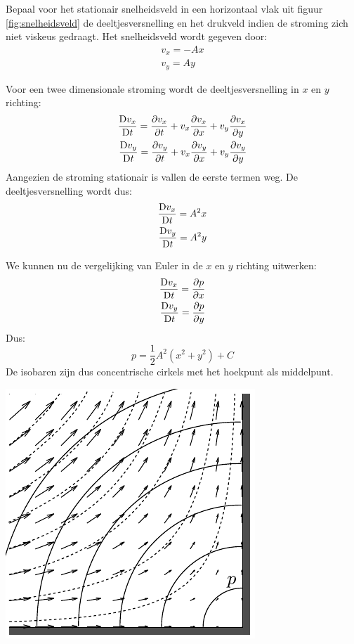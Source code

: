\begin{voorbeeld}
	Bepaal voor het stationair snelheidsveld in een horizontaal vlak uit figuur \ref{fig:snelheidsveld} de deeltjesversnelling en het drukveld indien de stroming zich niet viskeus gedraagt. Het snelheidsveld wordt gegeven door:
	\begin{align*}
		v_x = -A x \\
		v_y = A y
	\end{align*}
	
	Voor een twee dimensionale stroming wordt de deeltjesversnelling in $x$ en $y$ richting:
	\begin{align*}
		\frac{\mathrm{D} v_x}{\mathrm{D} t} = \frac{\partial v_x}{\partial t} + v_x \frac{\partial v_x}{\partial x} + v_y \frac{\partial v_x}{\partial y} \\
		\frac{\mathrm{D} v_y}{\mathrm{D} t} = \frac{\partial v_y}{\partial t} + v_x \frac{\partial v_y}{\partial x} + v_y \frac{\partial v_y}{\partial y}
	\end{align*}
	Aangezien de stroming stationair is vallen de eerste termen weg. De deeltjesversnelling wordt dus:
	\begin{align*}
		\frac{\mathrm{D} v_x}{\mathrm{D} t} = A^2 x \\
		\frac{\mathrm{D} v_y}{\mathrm{D} t} = A^2 y
	\end{align*}
	
	We kunnen nu de	vergelijking van Euler in de $x$ en $y$ richting uitwerken:
	\begin{align*}
		\frac{\mathrm{D} v_x}{\mathrm{D} t} = \frac{\partial p}{\partial x} \\
		\frac{\mathrm{D} v_y}{\mathrm{D} t} = \frac{\partial p}{\partial y}
	\end{align*}
	Dus:
	\begin{equation*}
		p = \frac{1}{2} A^2 \left(x^2 +y^2 \right) + C
	\end{equation*}
	De isobaren zijn dus concentrische cirkels met het hoekpunt als middelpunt.
	\begin{center}
		\includegraphics{fig/deeltjesvergelijkingen/Snelheidsveld_en_drukveld}
	\end{center}
\end{voorbeeld}
